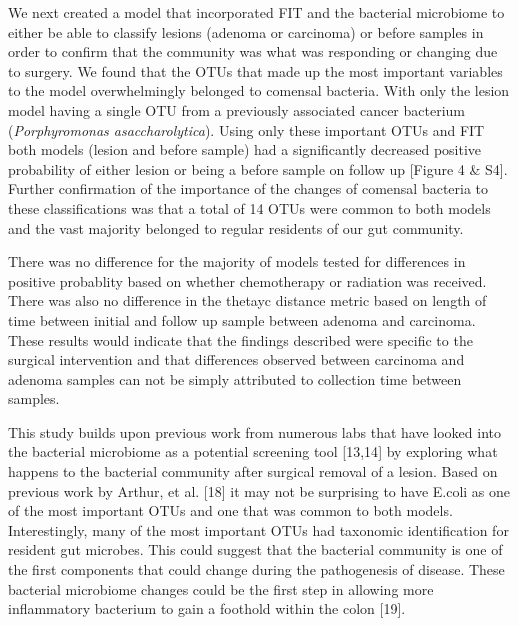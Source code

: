 \documentclass[12pt,]{article}
\begin{document}
We next created a model that incorporated FIT and the bacterial
microbiome to either be able to classify lesions (adenoma or carcinoma)
or before samples in order to confirm that the community was what was
responding or changing due to surgery. We found that the OTUs that made
up the most important variables to the model overwhelmingly belonged to
comensal bacteria. With only the lesion model having a single OTU from a
previously associated cancer bacterium (\emph{Porphyromonas
asaccharolytica}). Using only these important OTUs and FIT both models
(lesion and before sample) had a significantly decreased positive
probability of either lesion or being a before sample on follow up
{[}Figure 4 \& S4{]}. Further confirmation of the importance of the
changes of comensal bacteria to these classifications was that a total
of 14 OTUs were common to both models and the vast majority belonged to
regular residents of our gut community.

There was no difference for the majority of models tested for
differences in positive probablity based on whether chemotherapy or
radiation was received. There was also no difference in the thetayc
distance metric based on length of time between initial and follow up
sample between adenoma and carcinoma. These results would indicate that
the findings described were specific to the surgical intervention and
that differences observed between carcinoma and adenoma samples can not
be simply attributed to collection time between samples.

This study builds upon previous work from numerous labs that have looked
into the bacterial microbiome as a potential screening tool {[}13,14{]}
by exploring what happens to the bacterial community after surgical
removal of a lesion. Based on previous work by Arthur, et al. {[}18{]}
it may not be surprising to have E.coli as one of the most important
OTUs and one that was common to both models. Interestingly, many of the
most important OTUs had taxonomic identification for resident gut
microbes. This could suggest that the bacterial community is one of the
first components that could change during the pathogenesis of disease.
These bacterial microbiome changes could be the first step in allowing
more inflammatory bacterium to gain a foothold within the colon
{[}19{]}.
\end{document}

